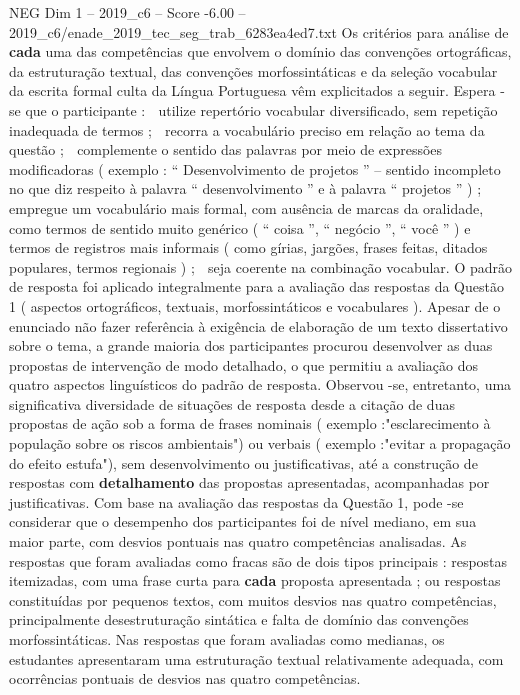 \begin{textsample}{NEG Dim 1 – 2019\_c6 – Score -6.00 – 2019\_c6/enade\_2019\_tec\_seg\_trab\_6283ea4ed7.txt}
Os critérios para análise de \textbf{cada} uma das competências que envolvem o domínio das convenções ortográficas, da estruturação textual, das convenções morfossintáticas e da seleção vocabular da escrita formal culta da Língua Portuguesa vêm explicitados a seguir.
Espera -se que o participante :  utilize repertório vocabular diversificado, sem repetição inadequada de termos ;  recorra a vocabulário preciso em relação ao tema da questão ;  complemente o sentido das palavras por meio de expressões modificadoras ( exemplo : “ Desenvolvimento de projetos ” – sentido incompleto no que diz respeito à palavra “ desenvolvimento ” e à palavra “ projetos ” ) ;  empregue um vocabulário mais formal, com ausência de marcas da oralidade, como termos de sentido muito genérico ( “ coisa ”, “ negócio ”, “ você ” ) e termos de registros mais informais ( como gírias, jargões, frases feitas, ditados populares, termos regionais ) ;  seja coerente na combinação vocabular.
O padrão de resposta foi aplicado integralmente para a avaliação das respostas da Questão 1 ( aspectos ortográficos, textuais, morfossintáticos e vocabulares ).
Apesar de o enunciado não fazer referência à exigência de elaboração de um texto dissertativo sobre o tema, a grande maioria dos participantes procurou desenvolver as duas propostas de intervenção de modo detalhado, o que permitiu a avaliação dos quatro aspectos linguísticos do padrão de resposta.
Observou -se, entretanto, uma significativa diversidade de situações de resposta desde a citação de duas propostas de ação sob a forma de frases nominais ( exemplo :"esclarecimento à população sobre os riscos ambientais") ou verbais ( exemplo :"evitar a propagação do efeito estufa"), sem desenvolvimento ou justificativas, até a construção de respostas com \textbf{detalhamento} das propostas apresentadas, acompanhadas por justificativas.
Com base na avaliação das respostas da Questão 1, pode -se considerar que o desempenho dos participantes foi de nível mediano, em sua maior parte, com desvios pontuais nas quatro competências analisadas.
As respostas que foram avaliadas como fracas são de dois tipos principais : respostas itemizadas, com uma frase curta para \textbf{cada} proposta apresentada ; ou respostas constituídas por pequenos textos, com muitos desvios nas quatro competências, principalmente desestruturação sintática e falta de domínio das convenções morfossintáticas.
Nas respostas que foram avaliadas como medianas, os estudantes apresentaram uma estruturação textual relativamente adequada, com ocorrências pontuais de desvios nas quatro competências.

\end{textsample}
